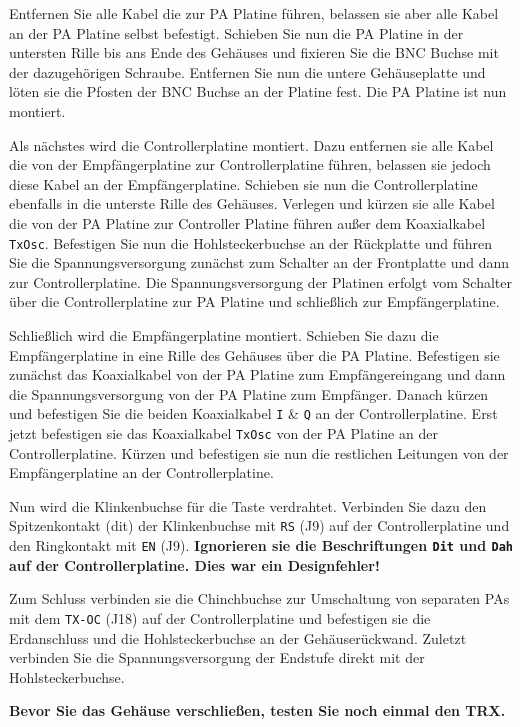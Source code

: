 \documentclass[10pt, a4paper]{paper}
\newcommand{\warn}[1]{\textbf{#1}}
\newcommand{\con}[1]{\texttt{#1}}
\begin{document}
Entfernen Sie alle Kabel die zur PA Platine führen, belassen sie aber alle Kabel an der PA Platine selbst befestigt. Schieben Sie nun die PA Platine in der untersten Rille bis ans Ende des Gehäuses und fixieren Sie die BNC Buchse mit der dazugehörigen Schraube. Entfernen Sie nun die untere Gehäuseplatte und löten sie die Pfosten der BNC Buchse an der Platine fest. Die PA Platine ist nun montiert.

Als nächstes wird die Controllerplatine montiert. Dazu entfernen sie alle Kabel die von der Empfängerplatine zur Controllerplatine führen, belassen sie jedoch diese Kabel an der Emp\-fän\-ger\-pla\-ti\-ne. Schieben sie nun die Controllerplatine ebenfalls in die unterste Rille des Gehäuses. Verlegen und kürzen sie alle Kabel die von der PA Platine zur Controller Platine führen außer dem Koaxialkabel \con{TxOsc}. Befestigen Sie nun die Hohlsteckerbuchse an der Rückplatte und führen Sie die Spannungsversorgung zunächst zum Schalter an der Frontplatte und dann zur Controllerplatine. Die Spannungsversorgung der Platinen erfolgt vom Schalter über die Controllerplatine zur PA Platine und schließlich zur Empfängerplatine. 

Schließlich wird die Empfängerplatine montiert. Schieben Sie dazu die Empfängerplatine in eine Rille des Gehäuses über die PA Platine. Befestigen sie zunächst das Koaxialkabel von der PA Platine zum Empfängereingang und dann die Spannungsversorgung von der PA Platine zum Empfänger.
Danach kürzen und befestigen Sie die beiden Koaxialkabel \con{I} \& \con{Q} an der Controllerplatine. Erst jetzt befestigen sie das Koaxialkabel \con{TxOsc} von der PA Platine an der Controllerplatine. Kürzen und befestigen sie nun die restlichen Leitungen von der Empfängerplatine an der Controllerplatine. 

Nun wird die Klinkenbuchse für die Taste verdrahtet. Verbinden Sie dazu den Spitzenkontakt (dit) der Klinkenbuchse mit \con{RS} (J9) auf der Controllerplatine und den Ringkontakt mit \con{EN} (J9). \warn{Ignorieren sie die Beschriftungen \con{Dit} und \con{Dah} auf der Controllerplatine. Dies war ein Designfehler!} 

Zum Schluss verbinden sie die Chinchbuchse zur Umschaltung von separaten PAs mit dem \con{TX-OC} (J18) auf der Controllerplatine und befestigen sie die Erdanschluss und die Hohlsteckerbuchse an der Gehäuserückwand. Zuletzt verbinden Sie die Spannungsversorgung der Endstufe direkt mit der Hohlsteckerbuchse.

\warn{Bevor Sie das Gehäuse verschließen, testen Sie noch einmal den TRX.}
\end{document}

